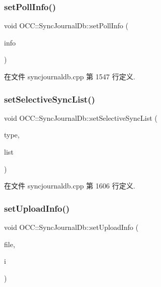 \subsubsection{\texorpdfstring{set\+Poll\+Info()}{setPollInfo()}}
{\footnotesize\ttfamily void O\+C\+C\+::\+Sync\+Journal\+Db\+::set\+Poll\+Info (\begin{DoxyParamCaption}\item[{const \hyperlink{struct_o_c_c_1_1_sync_journal_db_1_1_poll_info}{Poll\+Info} \&}]{info }\end{DoxyParamCaption})}



在文件 syncjournaldb.\+cpp 第 1547 行定义.

\mbox{\label{class_o_c_c_1_1_sync_journal_db_acc27e00e5daa1643fe9c356e7c4bb34e}} 
\subsubsection{\texorpdfstring{set\+Selective\+Sync\+List()}{setSelectiveSyncList()}}
{\footnotesize\ttfamily void O\+C\+C\+::\+Sync\+Journal\+Db\+::set\+Selective\+Sync\+List (\begin{DoxyParamCaption}\item[{\hyperlink{class_o_c_c_1_1_sync_journal_db_ad028daa35155c92ce2e3863602f9feeb}{Sync\+Journal\+Db\+::\+Selective\+Sync\+List\+Type}}]{type,  }\item[{const Q\+String\+List \&}]{list }\end{DoxyParamCaption})}



在文件 syncjournaldb.\+cpp 第 1606 行定义.

\mbox{\label{class_o_c_c_1_1_sync_journal_db_a7a5b11baa13b62617fe72bacaf07b0bc}} 
\subsubsection{\texorpdfstring{set\+Upload\+Info()}{setUploadInfo()}}
{\footnotesize\ttfamily void O\+C\+C\+::\+Sync\+Journal\+Db\+::set\+Upload\+Info (\begin{DoxyParamCaption}\item[{const Q\+String \&}]{file,  }\item[{const \hyperlink{struct_o_c_c_1_1_sync_journal_db_1_1_upload_info}{Upload\+Info} \&}]{i }\end{DoxyParamCaption})}




